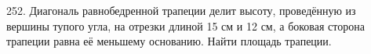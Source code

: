 252. Диагональ равнобедренной трапеции делит высоту,
проведённую из вершины тупого угла, на отрезки длиной
15 см и 12 см, а боковая сторона трапеции равна её
меньшему основанию. Найти площадь трапеции.\\
